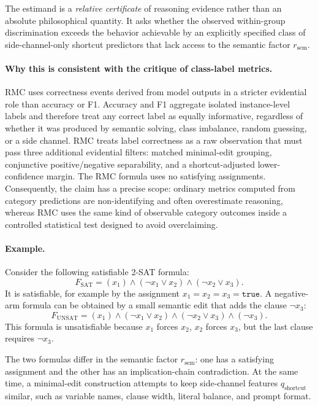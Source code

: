 \documentclass[conference]{IEEEtran}
\theoremstyle{remark}
\newcommand{\reasonFac}{r_{\mathrm{sem}}}
\newcommand{\shortcutFac}{q_{\mathrm{shortcut}}}
\begin{document}
The estimand is a \emph{relative certificate} of reasoning evidence rather than an absolute philosophical quantity.  It asks whether the observed within-group discrimination exceeds the behavior achievable by an explicitly specified class of side-channel-only shortcut predictors that lack access to the semantic factor $\reasonFac$.

\paragraph{Why this is consistent with the critique of class-label metrics.}
RMC uses correctness events derived from model outputs in a stricter evidential role than accuracy or F1.  Accuracy and F1 aggregate isolated
instance-level labels and therefore treat any correct label as equally
informative, regardless of whether it was produced by semantic solving, class
imbalance, random guessing, or a side channel.  RMC treats label
correctness as a raw observation that must pass three additional evidential
filters: matched minimal-edit grouping, conjunctive positive/negative
separability, and a shortcut-adjusted lower-confidence margin.  The RMC formula uses no satisfying assignments.  Consequently, the claim has a precise scope: ordinary metrics computed from category predictions are non-identifying and often overestimate reasoning, whereas RMC uses the same kind of observable category outcomes inside a controlled statistical test designed to avoid overclaiming.

\paragraph{Example.}
Consider the following satisfiable 2-SAT formula:
\begin{equation}\label{eq:formula-08}
F_{\mathrm{SAT}}
=
(x_1)
\wedge
(\neg x_1\vee x_2)
\wedge
(\neg x_2\vee x_3).
\end{equation}
It is satisfiable, for example by the assignment
$x_1=x_2=x_3=\texttt{true}$.
A negative-arm formula can be obtained by a small semantic edit that adds the
clause $\neg x_3$:
\begin{equation}\label{eq:formula-09}
F_{\mathrm{UNSAT}}
=
(x_1)
\wedge
(\neg x_1\vee x_2)
\wedge
(\neg x_2\vee x_3)
\wedge
(\neg x_3).
\end{equation}
This formula is unsatisfiable because $x_1$ forces $x_2$, $x_2$ forces $x_3$,
but the last clause requires $\neg x_3$.

The two formulas differ in the semantic factor $\reasonFac$: one has a
satisfying assignment and the other has an implication-chain contradiction.
At the same time, a minimal-edit construction attempts to keep side-channel
features $\shortcutFac$ similar, such as variable names, clause width, literal
balance, and prompt format.
\end{document}
